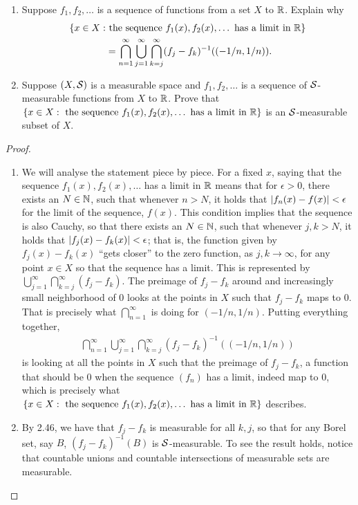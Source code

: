 \begin{exercise}{14}
\begin{enumerate}
    \item Suppose $f_1,f_2,\dots$ is a sequence of functions from a set $X$ to $\mathbb{R}$.
    Explain why
    \begin{align*}
        \{ x\in X:& \text{ the sequence } f_1(x),f_2(x),\dots \text{ has a limit in } \mathbb{R}\}\\
        &= \bigcap_{n=1}^\infty \bigcup_{j=1}^\infty \bigcap_{k=j}^\infty (f_j-f_k)^{-1}((-1/n,1/n)).
    \end{align*}
    \item Suppose $(X,\mathcal{S})$ is a measurable space and $f_1,f_2,\dots$ is a sequence of $\mathcal{S}$-measurable functions from $X$ to $\mathbb{R}$.
    Prove that 
    $\{ x\in X: \text{ the sequence } f_1(x),f_2(x),\dots \text{ has a limit in } \mathbb{R}\}$
    is an $\mathcal{S}$-measurable subset of $X$.
\end{enumerate}
\end{exercise}
\begin{proof}
\begin{enumerate}
    \item We will analyse the statement piece by piece.
    For a fixed $x$, saying that the sequence $f_1(x), f_2(x), \dots$ has a limit in $\mathbb{R}$ means that for $\epsilon>0$, there exists an $N\in\mathbb{N}$, such that whenever $n>N$, it holds that $\left\lvert f_n(x)-f(x)\right\rvert <\epsilon$ for the limit of the sequence, $f(x)$.
    This condition implies that the sequence is also Cauchy, so that there exists an $N\in\mathbb{N}$, such that whenever $j,k>N$, it holds that $\left\lvert f_j(x) - f_k(x)\right\rvert<\epsilon$;
    that is, the function given by $f_j(x)-f_k(x)$ ``gets closer'' to the zero function, as $j,k \to \infty$, for any point $x\in X$ so that the sequence has a limit.
    This is represented by $\bigcup_{j=1}^\infty \bigcap_{k=j}^\infty (f_j-f_k)$.
    The preimage of $f_j-f_k$ around and increasingly small neighborhood of 0 looks at the points in $X$ such that $f_j-f_k$ maps to 0.
    That is precisely what $\bigcap_{n=1}^\infty$ is doing for $(-1/n, 1/n)$. 
    Putting everything together,
    \begin{align*}
        \bigcap_{n=1}^\infty \bigcup_{j=1}^\infty \bigcap_{k=j}^\infty (f_j-f_k)^{-1}((-1/n,1/n))
    \end{align*}
    is looking at all the points in $X$ such that the preimage of $f_j-f_k$, a function that should be 0 when the sequence $(f_n)$ has a limit, indeed map to 0, which is precisely what $\{ x\in X: \text{ the sequence } f_1(x),f_2(x),\dots \text{ has a limit in } \mathbb{R}\}$ describes.
    \item By 2.46, we have that $f_j-f_k$ is measurable for all $k,j$, so that for any Borel set, say $B$, $(f_j-f_k)^{-1}(B)$ is $\mathcal{S}$-measurable.
    To see the result holds, notice that countable unions and countable intersections of measurable sets are measurable.
\end{enumerate}
\end{proof} 

